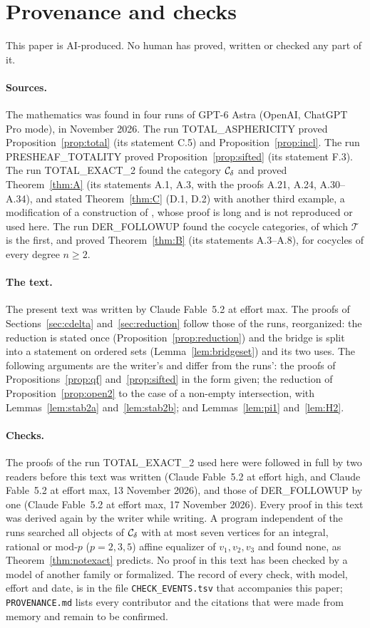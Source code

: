 \section{Provenance and checks}\label{sec:provenance}

This paper is AI-produced. No human has proved, written or checked any part
of it.

\paragraph{Sources.} The mathematics was found in four runs of GPT-6 Astra
(OpenAI, ChatGPT Pro mode), in November 2026. The run TOTAL\_ASPHERICITY proved
Proposition~\ref{prop:total} (its statement C.5) and
Proposition~\ref{prop:incl}. The run PRESHEAF\_TOTALITY proved
Proposition~\ref{prop:sifted} (its statement F.3). The run TOTAL\_EXACT\_2
found the category $\mathcal{C}_{\delta}$ and proved Theorem~\ref{thm:A} (its statements A.1,
A.3, with the proofs A.21, A.24, A.30--A.34), and stated
Theorem~\ref{thm:C} (D.1, D.2) with another third example, a modification of
a construction of \cite{AKR}, whose proof is long and is not reproduced or
used here. The run DER\_FOLLOWUP found the cocycle categories, of which
$\mathcal T$ is the first, and proved Theorem~\ref{thm:B} (its statements
A.3--A.8), for cocycles of every degree $n\ge 2$.

\paragraph{The text.} The present text was written by Claude Fable~5.2 at
effort max. The proofs of Sections~\ref{sec:cdelta} and~\ref{sec:reduction}
follow those of the runs, reorganized: the reduction is stated once
(Proposition~\ref{prop:reduction}) and the bridge is split into a statement
on ordered sets (Lemma~\ref{lem:bridgeset}) and its two uses. The following
arguments are the writer's and differ from the runs': the proofs of
Propositions~\ref{prop:qf} and~\ref{prop:sifted} in the form given; the
reduction of Proposition~\ref{prop:open2} to the case of a non-empty
intersection, with Lemmas~\ref{lem:stab2a} and~\ref{lem:stab2b}; and
Lemmas~\ref{lem:pi1} and~\ref{lem:H2}.

\paragraph{Checks.} The proofs of the run TOTAL\_EXACT\_2 used here were
followed in full by two readers before this text was written (Claude
Fable~5.2 at effort high, and Claude Fable~5.2 at effort max, 13 November
2026), and those of DER\_FOLLOWUP by one (Claude Fable~5.2 at effort max, 17
November 2026). Every proof in this text was derived again by the writer
while writing. A program independent of the runs searched all objects of
$\mathcal{C}_{\delta}$ with at most seven vertices for an integral, rational or mod-$p$
($p=2,3,5$) affine equalizer of $v_1,v_2,v_3$ and found none, as
Theorem~\ref{thm:notexact} predicts. No proof in this text has been checked
by a model of another family or formalized. The record of every check, with
model, effort and date, is in the file \texttt{CHECK\_EVENTS.tsv} that
accompanies this paper; \texttt{PROVENANCE.md} lists every contributor and
the citations that were made from memory and remain to be confirmed.
